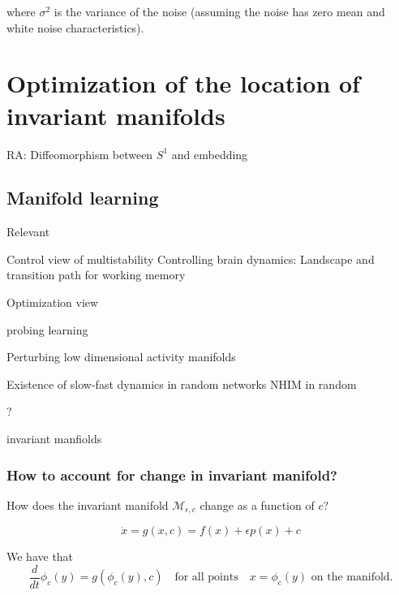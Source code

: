 \documentclass{article}
\theoremstyle{definition} \newtheorem{definition}{Definition}
\theoremstyle{remark} \newtheorem{remark}{Remark}
\newcommand{\manifold}{\mathcal{M}}
\newcounter{ct}
\begin{document}
where \( \sigma^2 \) is the variance of the noise (assuming the noise has zero mean and white noise characteristics).




\section{Optimization of the location of invariant manifolds} %
\citep{agrachev2009controllability,agrachev2022control}

RA: Diffeomorphism between $S^1$  and embedding

\citep{ocko2018emergent}

\subsection{Manifold learning}
\citep{huys2014functional}
Relevant \citep{chang2023novo}

Control view \citep{pisarchik2014control} of multistability
Controlling brain dynamics: Landscape and transition path for working memory \citep{ye2023wm}
\citep{badre2021dimensionality}
\citep{altan2023control}

Optimization view \citep{hennig2021learningoptimization}

\citep{kumar2023bundle}

probing learning \citep{marschall2023probing}

Perturbing low dimensional activity manifolds \citep{warnberg2019perturbing}

Existence of slow-fast dynamics in random networks \citep{schmalfuss2008invariant, shaham2017slow}
NHIM in random \citep{li2013normally}

? \citep{federer2018self}

invariant manfiolds \citep{guckenheimer2015invariant}

\subsubsection{How to account for change in invariant manifold?}
How does the invariant manifold $\manifold_{\epsilon,c}$ change as a function of $c$?

\begin{equation}
\dot x = g(x,c) = f(x) + \epsilon p(x) + c
\end{equation}

We have that 
\begin{equation}
\frac{d}{dt} \phi_c(y) =g(\phi_c(y), c) \quad \text{for all points} \quad x = \phi_c(y) \text{ on the manifold}.
\end{equation}
\end{document}
